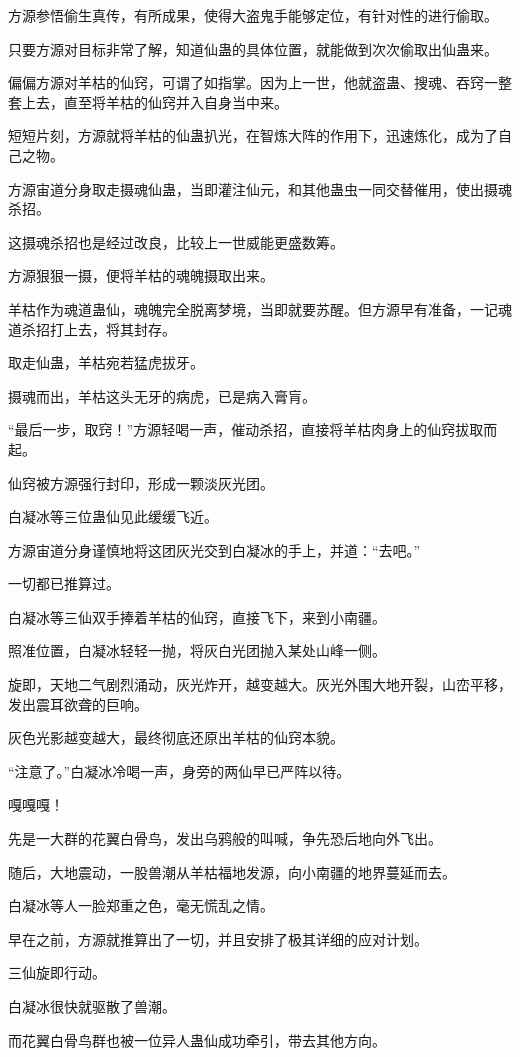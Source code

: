 \begin{this_body}
方源参悟偷生真传，有所成果，使得大盗鬼手能够定位，有针对性的进行偷取。

只要方源对目标非常了解，知道仙蛊的具体位置，就能做到次次偷取出仙蛊来。

偏偏方源对羊枯的仙窍，可谓了如指掌。因为上一世，他就盗蛊、搜魂、吞窍一整套上去，直至将羊枯的仙窍并入自身当中来。

短短片刻，方源就将羊枯的仙蛊扒光，在智炼大阵的作用下，迅速炼化，成为了自己之物。

方源宙道分身取走摄魂仙蛊，当即灌注仙元，和其他蛊虫一同交替催用，使出摄魂杀招。

这摄魂杀招也是经过改良，比较上一世威能更盛数筹。

方源狠狠一摄，便将羊枯的魂魄摄取出来。

羊枯作为魂道蛊仙，魂魄完全脱离梦境，当即就要苏醒。但方源早有准备，一记魂道杀招打上去，将其封存。

取走仙蛊，羊枯宛若猛虎拔牙。

摄魂而出，羊枯这头无牙的病虎，已是病入膏肓。

“最后一步，取窍！”方源轻喝一声，催动杀招，直接将羊枯肉身上的仙窍拔取而起。

仙窍被方源强行封印，形成一颗淡灰光团。

白凝冰等三位蛊仙见此缓缓飞近。

方源宙道分身谨慎地将这团灰光交到白凝冰的手上，并道：“去吧。”

一切都已推算过。

白凝冰等三仙双手捧着羊枯的仙窍，直接飞下，来到小南疆。

照准位置，白凝冰轻轻一抛，将灰白光团抛入某处山峰一侧。

旋即，天地二气剧烈涌动，灰光炸开，越变越大。灰光外围大地开裂，山峦平移，发出震耳欲聋的巨响。

灰色光影越变越大，最终彻底还原出羊枯的仙窍本貌。

“注意了。”白凝冰冷喝一声，身旁的两仙早已严阵以待。

嘎嘎嘎！

先是一大群的花翼白骨鸟，发出乌鸦般的叫喊，争先恐后地向外飞出。

随后，大地震动，一股兽潮从羊枯福地发源，向小南疆的地界蔓延而去。

白凝冰等人一脸郑重之色，毫无慌乱之情。

早在之前，方源就推算出了一切，并且安排了极其详细的应对计划。

三仙旋即行动。

白凝冰很快就驱散了兽潮。

而花翼白骨鸟群也被一位异人蛊仙成功牵引，带去其他方向。


\end{this_body}
